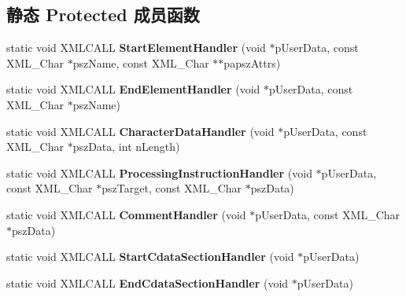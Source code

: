 \subsection*{静态 Protected 成员函数}
\begin{DoxyCompactItemize}
\item 
\hypertarget{class_c_expat_impl_a5373421f1af2e313ee1dc27b7313caf4}{static void X\+M\+L\+C\+A\+L\+L {\bfseries Start\+Element\+Handler} (void $\ast$p\+User\+Data, const X\+M\+L\+\_\+\+Char $\ast$psz\+Name, const X\+M\+L\+\_\+\+Char $\ast$$\ast$papsz\+Attrs)}\label{class_c_expat_impl_a5373421f1af2e313ee1dc27b7313caf4}

\item 
\hypertarget{class_c_expat_impl_a1f5fe7ee8779180368dc4205698f9bd6}{static void X\+M\+L\+C\+A\+L\+L {\bfseries End\+Element\+Handler} (void $\ast$p\+User\+Data, const X\+M\+L\+\_\+\+Char $\ast$psz\+Name)}\label{class_c_expat_impl_a1f5fe7ee8779180368dc4205698f9bd6}

\item 
\hypertarget{class_c_expat_impl_ab915a0ae06a45bf696de219d540e4f7a}{static void X\+M\+L\+C\+A\+L\+L {\bfseries Character\+Data\+Handler} (void $\ast$p\+User\+Data, const X\+M\+L\+\_\+\+Char $\ast$psz\+Data, int n\+Length)}\label{class_c_expat_impl_ab915a0ae06a45bf696de219d540e4f7a}

\item 
\hypertarget{class_c_expat_impl_a06e10a847a2cc5c3c97f2de547ea6f2f}{static void X\+M\+L\+C\+A\+L\+L {\bfseries Processing\+Instruction\+Handler} (void $\ast$p\+User\+Data, const X\+M\+L\+\_\+\+Char $\ast$psz\+Target, const X\+M\+L\+\_\+\+Char $\ast$psz\+Data)}\label{class_c_expat_impl_a06e10a847a2cc5c3c97f2de547ea6f2f}

\item 
\hypertarget{class_c_expat_impl_a9a1446e70169fd38d5536442e527013e}{static void X\+M\+L\+C\+A\+L\+L {\bfseries Comment\+Handler} (void $\ast$p\+User\+Data, const X\+M\+L\+\_\+\+Char $\ast$psz\+Data)}\label{class_c_expat_impl_a9a1446e70169fd38d5536442e527013e}

\item 
\hypertarget{class_c_expat_impl_ad80351fca407479c23faa47a7e080ace}{static void X\+M\+L\+C\+A\+L\+L {\bfseries Start\+Cdata\+Section\+Handler} (void $\ast$p\+User\+Data)}\label{class_c_expat_impl_ad80351fca407479c23faa47a7e080ace}

\item 
\hypertarget{class_c_expat_impl_ade8f1473c8a848383282413918afc3af}{static void X\+M\+L\+C\+A\+L\+L {\bfseries End\+Cdata\+Section\+Handler} (void $\ast$p\+User\+Data)}\label{class_c_expat_impl_ade8f1473c8a848383282413918afc3af}


\end{DoxyCompactItemize}
